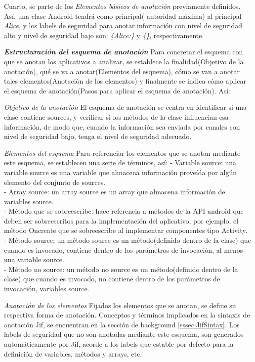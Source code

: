 Cuarto, se parte de los \textit{Elementos básicos de anotación} previamente
definidos. Así, una clase Android tendrá como principal( autoridad máxima) al
principal \emph{Alice}, y los labels de seguridad para anotar información con
nivel de seguridad alto y nivel de seguridad bajo son: \emph{\{Alice:\}} y
\emph{\{\}}, respectivamente.

\textbf{\textit{Estructuración del esquema de anotación}}\newline 
Para concretar el esquema con que se anotan los aplicativos a analizar, se
establece la finalidad(Objetivo de la anotación), qué se va a anotar(Elementos
del esquema), cómo se van a anotar tales elementos(Anotación de los elementos) y
finalmente se indica cómo aplicar el esquema de anotación(Pasos para aplicar el
esquema de anotación). Así:

\textit{Objetivo de la anotación}\newline
El esquema de anotación se centra en identificar si una clase contiene sources,
y verificar si los métodos de la clase influencian esa información, de modo que,
cuando la información sea enviada por canales con nivel de seguridad bajo, tenga
el nivel de seguridad adecuado.

\textit{Elementos del esquema}\newline
Para referenciar los elementos que se anotan mediante este esquema, se
establecen una serie de términos, así:\newline
- Variable source: una variable source es una variable que almacena
información proveída por algún elemento del conjunto de sources.\\
- Array source: un array source es un array que almacena información de
variables source.\\
- Método que se sobreescribe: hace referencia a métodos de la API android
que deben ser sobreescritos para la implementación del aplicativo, por ejemplo, el
método Oncreate que se sobreescribe al implementar componentes tipo
Activity.\\
- Método source: un método source es un método(definido dentro de la
clase) que cuando es invocado, contiene dentro de los parámetros de invocación, al menos
una variable source.\\
- Método no source: un método no source es un método(definido dentro de la
clase) que cuando es invocado, no contiene dentro de los parámetros de invocación,
variables source.

\textit{Anotación de los elementos}\newline
Fijados los elementos que se anotan, se define su respectiva forma de anotación.
Conceptos y términos implicados en la sintaxis de anotación Jif, se
encuentran en la sección de background \ref{sssec:JifSintax}.
Los labels de seguridad que no son anotadas mediante este esquema, son generados
automáticamente por Jif, acorde a los labels que estable por defecto para la
definición de variables, métodos y arrays, etc.

